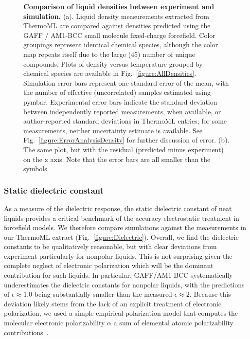 \documentclass[aps,pre,twocolumn,nofootinbib,superscriptaddress,linenumbers]{revtex4-1}
\begin{document}
\begin{figure}
\caption{{\bf Comparison of liquid densities between experiment and simulation.}
(a).  Liquid density measurements extracted from ThermoML are compared against densities predicted using the GAFF / AM1-BCC small molecule fixed-charge forcefield.
Color groupings represent identical chemical species, although the color map repeats itself due to the large (45) number of unique compounds.
Plots of density versus temperature grouped by chemical species are available in Fig.~\ref{figure:AllDensities}.
Simulation error bars represent one standard error of the mean, with the number of effective (uncorrelated) samples estimated using pymbar.  
Experimental error bars indicate the standard deviation between independently reported measurements, when available, or author-reported standard deviations in ThermoML entries; for some measurements, neither uncertainty estimate is available.  
See Fig.~\ref{figure:ErrorAnalysisDensity} for further discussion of error.  (b).  The same plot, but with the residual (predicted minus experiment) on the x axis.  Note that the error bars are all smaller than the symbols.  
}
\label{figure:Density}
\end{figure}


\subsubsection{Static dielectric constant}

As a measure of the dielectric response, the static dielectric constant of neat liquids provides a critical benchmark of the accuracy electrostatic treatment in forcefield models.  
We therefore compare simulations against the measurements in our ThermoML extract (Fig.~\ref{figure:Dielectric}).  
Overall, we find the dielectric constants to be qualitatively reasonable, but with clear deviations from experiment particularly for nonpolar liquids. 
This is not surprising given the complete neglect of electronic polarization which will be the dominant contribution for such liquids.
In particular, GAFF/AM1-BCC systematically underestimates the dielectric constants for nonpolar liquids, with the predictions of $\epsilon \approx 1.0 $ being substantially smaller than the measured $\epsilon \approx 2$.  
Because this deviation likely stems from the lack of an explicit treatment of electronic polarization, we used a simple empirical polarization model that computes the molecular electronic polarizability $\alpha$ a sum of elemental atomic polarizability contributions~\cite{bosque2002polarizabilities}.
\end{document}
